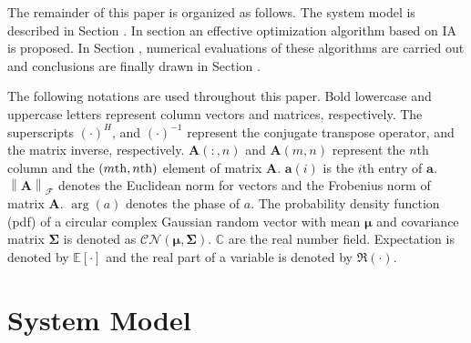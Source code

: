 \documentclass[11pt,draftcls,onecolumn]{IEEEtran}
\begin{document}
The remainder of this paper is organized as follows. The system model is described in Section \uppercase\expandafter{}. In section \uppercase\expandafter{} an effective optimization algorithm based on IA is proposed. In Section \uppercase\expandafter{}, numerical evaluations of these algorithms are carried out and conclusions are finally drawn in Section \uppercase\expandafter{}.

The following notations are used throughout this paper. Bold lowercase and uppercase letters represent column vectors and matrices, respectively. The superscripts $\left(\cdot\right)^{H}$, and $\left(\cdot\right)^{-1}$ represent the conjugate transpose operator, and the matrix inverse, respectively. $\bm{A}\left(:,n\right)$ and $\bm{A}\left(m,n\right)$ represent the $n$th column and the $\left(m{\rm th},n{\rm th}\right)$ element of matrix $\bm{A}$. $\bm{a}\left(i\right)$ is the $i$th entry of $\bm{a}$. $\left\|\bm{A}\right\|_{\mathcal{F}}$ denotes the Euclidean norm for vectors and the Frobenius norm of matrix $\bm{A}$. $\arg\left(a\right)$ denotes the phase of $a$. The probability density function (pdf) of a circular complex Gaussian random vector with mean $\bm{\mu}$ and covariance matrix $\bm{\Sigma}$ is denoted as $\mathcal{CN}\left(\bm{\mu},\bm{\Sigma}\right)$.  $\mathbb{C}$ are the real number field. Expectation is denoted by $\mathbb{E}\left[\cdot\right]$ and the real part of a variable is denoted by $\Re\left(\cdot\right)$.

\section{System Model}
\end{document}
